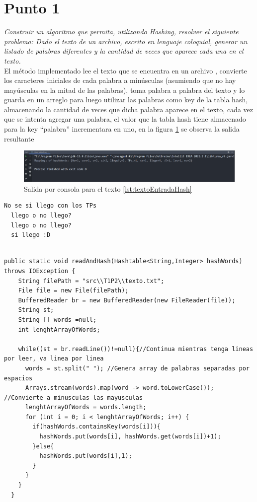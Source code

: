 \newpage
\section{Punto 1}
\textit{Construir un algoritmo que permita, utilizando Hashing, resolver el siguiente problema: Dado el texto de un archivo, escrito en lenguaje coloquial, generar un listado de palabras diferentes y la cantidad de veces que aparece cada una en el texto.
}\\


El método implementado lee el texto que se encuentra en un archivo , convierte los caracteres iniciales de cada palabra a minúsculas (asumiendo que no hay mayúsculas en la mitad de las palabras), toma palabra a palabra del texto y lo guarda en un arreglo para luego utilizar las palabras como key de la tabla hash, almacenando la cantidad de veces que dicha palabra aparece en el texto, cada vez que se intenta agregar una palabra, el valor que la tabla hash tiene almacenado para la key ``palabra'' incrementara en uno, en la figura \ref{fig:Consola hash palabra} se observa la salida resultante

\begin{figure}
  \centering
  \includegraphics[width=\textwidth, scale=1]{Images/Punto3/ConsolaHashPalabra.png}
  \caption{Salida por consola para el texto \ref{lst:textoEntradaHash} }
  \label{fig:Consola hash palabra}
\end{figure}

\begin{lstlisting}[style=java, caption= Texto de entrada, label={lst:textoEntradaHash}]
  No se si llego con los TPs
  llego o no llego?
  llego o no llego?
  si llego :D
  
 \end{lstlisting}

 \begin{lstlisting}[style=java, caption= Metodo readAndHash()\cite{readAndHashMetodo}]
  public static void readAndHash(Hashtable<String,Integer> hashWords) throws IOException {
    String filePath = "src\\T1P2\\texto.txt";
    File file = new File(filePath);
    BufferedReader br = new BufferedReader(new FileReader(file));
    String st;
    String [] words =null;
    int lenghtArrayOfWords;

    while((st = br.readLine())!=null){//Continua mientras tenga lineas por leer, va linea por linea
      words = st.split(" "); //Genera array de palabras separadas por espacios
      Arrays.stream(words).map(word -> word.toLowerCase()); //Convierte a minusculas las mayusculas
      lenghtArrayOfWords = words.length;
      for (int i = 0; i < lenghtArrayOfWords; i++) {
        if(hashWords.containsKey(words[i])){
          hashWords.put(words[i], hashWords.get(words[i])+1);
        }else{
          hashWords.put(words[i],1);
        }
      }
    }
  }
 \end{lstlisting}
